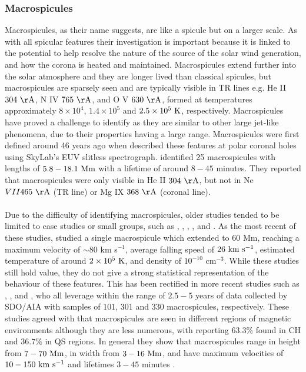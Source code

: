 \documentclass[12pt]{ociamthesis}
\newcommand{\kms}{~\rm{km ~s^{-1}}}
\newcommand{\np}{\\ \\}
\begin{document}
\subsubsection{Macrospicules}
\label{subsec:Mspic}
Macrospicules, as their name suggests, are like a spicule but on a larger scale. As with all spicular features their investigation is important because it is linked to the potential to help resolve the nature of the source of the solar wind generation, and how the corona is heated and maintained. Macrospicules extend further into the solar atmosphere and they are longer lived than classical spicules, but macrospicules are sparsely seen and are typically visible in TR lines e.g. He II $304~\rm{\AA}$, N IV $765~\rm{\AA}$, and O V $630~\rm{\AA}$, formed at temperatures approximately $8\times10^4$, $1.4\times10^5$ and $2.5\times10^5~\rm{K}$, respectively. Macrospicules have proved a challenge to identify as they are similar to other large jet-like phenomena, due to their properties having a large range. Macrospicules were first defined around 46 years ago when \cite{Bohlin1975ApJ197L133B} described these features at polar coronal holes using SkyLab's EUV slitless spectrograph. \cite{Bohlin1975ApJ197L133B} identified 25 macrospicules with lengths of $5.8-18.1~\rm{Mm}$ with a lifetime of around $8-45$ minutes. They reported that macrospicules were only visible in He II $304~\rm{\AA}$, but not in Ne $VII 465~\rm{\AA}$ (TR line) or Mg IX $368~\rm{\AA}$ (coronal line). \np
%
Due to the difficulty of identifying macrospicules, older studies tended to be limited to case studies or small groups, such as \cite{Moe1975SoPh4065K}, \cite{Bohlin1975ApJ197L133B}, \cite{Labonte1979SoPh61283L}, \cite{Pike1997SoPh175457P,Pike1998SoPh182333P}, and \cite{Parenti2002AA384303P}. As the most recent of these studies, \cite{Parenti2002AA384303P} studied a single macrospicule which extended to $60$ Mm, reaching a maximum velocity of $\sim 80$ km s$^{-1}$, average falling speed of $26\kms$, estimated temperature of around $2\times10^5~\rm{K}$, and density of $10^{-10}$ cm$^{-3}$. While these studies still hold value, they do not give a strong statistical representation of the behaviour of these features. This has been rectified in more recent studies such as \cite{Bennett2015ApJ808135B}, \cite{Kiss2017ApJ83547K}, and \cite{Loboda2019ApJ871230L}, who all leverage within the range of $2.5-5$ years of data collected by SDO/AIA with samples of $101$,
$301$ and $330$ macrospicules, respectively. These studies agreed with \cite{Wang1998ApJ509461W} that macrospicules are seen in different regions of magnetic environments although they are less numerous, with \cite{Loboda2019ApJ871230L} reporting $63.3\%$ found in CH and $36.7\%$ in QS regions. In general they show that macrospicules range in height from $7- 70~\rm{Mm}$, in width from $3-16~\rm{Mm}$, and have maximum velocities of $10-150\kms$ and  lifetimes $3-45$ minutes \citep{Bohlin1975ApJ197L133B, Withbroe1976ApJ, Karovska1994ApJ, Parenti2002AA384303P, Bennett2015ApJ808135B, Kiss2017ApJ83547K, Loboda2019ApJ871230L}. \np
\end{document}
